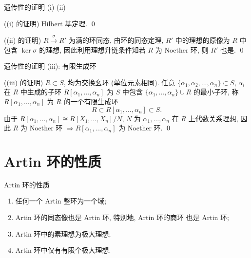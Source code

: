 
\begin{frame}{遗传性的证明 (i) (ii)}

\startproof[bg=yellow, fg=red]((i) 的证明)
Hilbert 基定理.
\qed

\pause

\startproof[bg=yellow, fg=red]((ii) 的证明)
$R \xrightarrow{\ \sigma\ } R'$ 为满的环同态, 由环的同态定理,
$R'$ 中的理想的原像为 $R$ 中包含 $\ker \sigma$ 的理想,
因此利用理想升链条件知若 $R$ 为 Noether 环, 则 $R'$ 也是.
\qed

\end{frame}


\begin{frame}{遗传性的证明 (iii): 有限生成环}

\startproof[bg=yellow, fg=red]((iii) 的证明)
$R \subset S$, 均为交换幺环 (单位元素相同). 任意
$\{ \alpha_1, \alpha_2, \dots, \alpha_n \} \subset S$,
$\alpha_i$ 在 $R$ 中生成的子环 $R[\alpha_1, \dots, \alpha_n]$
为 $S$ 中包含 $\{ \alpha_1, \dots, \alpha_n \} \cup R$ 的最小子环,
称 $R[\alpha_1, \dots, \alpha_n]$ 为 $R$ 的一个有限生成环
\[
R \subset R[\alpha_1, \dots, \alpha_n] \subset S .
\]
由于 $R[\alpha_1, \dots, \alpha_n] \cong R[X_1, \dots, X_n] / N$,
$N$ 为 $\alpha_1, \dots, \alpha_n$ 在 $R$ 上代数关系理想,
因此 $R$ 为 Noether 环 $\Longrightarrow R[\alpha_1, \dots, \alpha_n]$ 为 Noether 环.
\qed

\end{frame}


\section[Artin 环]{Artin 环的性质}


\begin{frame}{Artin 环的性质}

\begin{lem}
\begin{enumerate}
\item[(i)] 任何一个 Artin 整环为一个域;
\item[(ii)] Artin 环的同态像也是 Artin 环, 特别地, Artin 环的商环
  也是 Artin 环;
\item[(iii)] Artin 环中的素理想为极大理想;
\item[(iv)] Artin 环中仅有有限个极大理想.
\end{enumerate}
\end{lem}

\end{frame}

